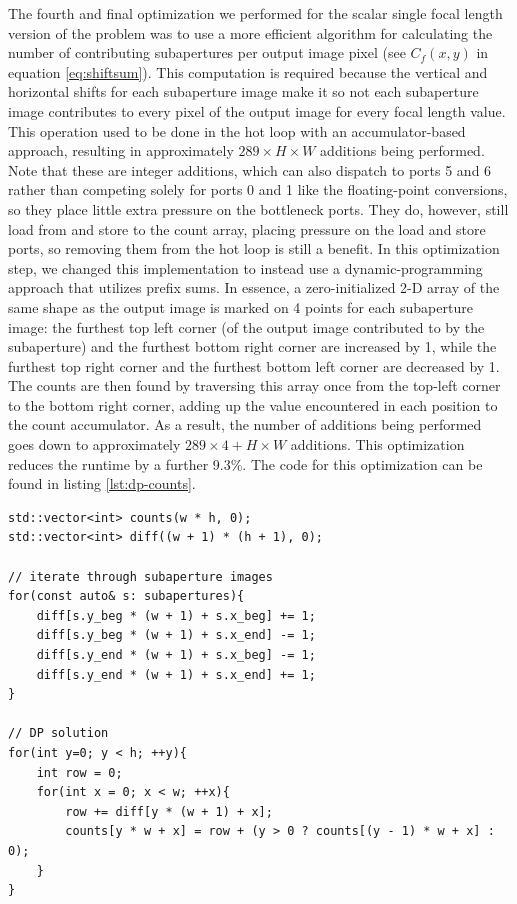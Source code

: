 \documentclass[letterpaper]{article}
\begin{document}
The fourth and final optimization we performed for the scalar single focal length version of the problem was to use a more efficient algorithm for calculating the number of contributing subapertures per output image pixel (see $C_f(x, y)$ in equation \ref{eq:shiftsum}). This computation is required because the vertical and horizontal shifts for each subaperture image make it so not each subaperture image contributes to every pixel of the output image for every focal length value. This operation used to be done in the hot loop with an accumulator-based approach, resulting in approximately $289 \times H \times W$ additions being performed. Note that these are integer additions, which can also dispatch to ports 5 and 6 rather than competing solely for ports 0 and 1 like the floating-point conversions, so they place little extra pressure on the bottleneck ports. They do, however, still load from and store to the count array, placing pressure on the load and store ports, so removing them from the hot loop is still a benefit. In this optimization step, we changed this implementation to instead use a dynamic-programming approach that utilizes prefix sums. In essence, a zero-initialized 2-D array of the same shape as the output image is marked on 4 points for each subaperture image: the furthest top left corner (of the output image contributed to by the subaperture) and the furthest bottom right corner are increased by 1, while the furthest top right corner and the furthest bottom left corner are decreased by 1. The counts are then found by traversing this array once from the top-left corner to the bottom right corner, adding up the value encountered in each position to the count accumulator. As a result, the number of additions being performed goes down to approximately $289 \times 4 + H \times W$ additions. This optimization reduces the runtime by a further 9.3\%. The code for this optimization can be found in listing \ref{lst:dp-counts}.

\begin{lstlisting}[style=cppstyle, caption={Algorithm for Finding Contribution Counts}, label={lst:dp-counts}]
std::vector<int> counts(w * h, 0);
std::vector<int> diff((w + 1) * (h + 1), 0);

// iterate through subaperture images
for(const auto& s: subapertures){
    diff[s.y_beg * (w + 1) + s.x_beg] += 1;
    diff[s.y_beg * (w + 1) + s.x_end] -= 1;
    diff[s.y_end * (w + 1) + s.x_beg] -= 1;
    diff[s.y_end * (w + 1) + s.x_end] += 1;
}

// DP solution
for(int y=0; y < h; ++y){
    int row = 0;
    for(int x = 0; x < w; ++x){
        row += diff[y * (w + 1) + x];
        counts[y * w + x] = row + (y > 0 ? counts[(y - 1) * w + x] : 0);
    }
}
\end{lstlisting}
\end{document}
